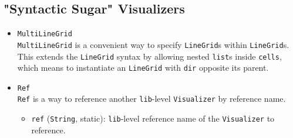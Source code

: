 \documentclass[11pt]{article}
\begin{document}
\subsection {"Syntactic Sugar" Visualizers}
\begin{itemize}
  \item \texttt{MultiLineGrid} \\
  \texttt{MultiLineGrid} is a convenient way to specify \texttt{LineGrid}s within \texttt{LineGrid}s. This extends the \texttt{LineGrid} syntax by allowing nested \texttt{list}s inside \texttt{cells}, which means to instantiate an \texttt{LineGrid} with \texttt{dir} opposite its parent.
  \item \texttt{Ref} \\
  \texttt{Ref} is a way to reference another \texttt{lib}-level \texttt{Visualizer} by reference name.
  \begin{itemize}
    \item \texttt{ref} (\texttt{String}, static): \texttt{lib}-level reference name of the \texttt{Visualizer} to reference.
  \end{itemize}
\end{itemize}
\end{document}
